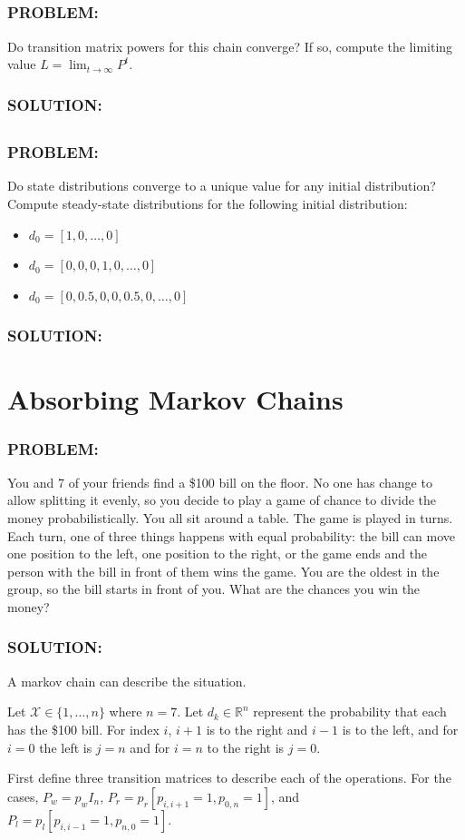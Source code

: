 \documentclass[]{article}
\newcommand{\Problem}{\subsubsection*{\textbf{PROBLEM:}}}
\newcommand{\Solution}{\subsubsection*{\textbf{SOLUTION:}}}
\newcommand{\R}{\mathbb{R}}
\begin{document}
\subsection{}
\Problem
Do transition matrix powers for this chain converge? If so, compute the limiting value $L = \lim_{t \to \infty} P^t$.
\Solution



\subsection{}
\Problem
Do state distributions converge to a unique value for any initial distribution? Compute steady-state distributions for the following initial distribution:
\begin{itemize}
    \item $d_0 = [1,0,\dots,0]$
    \item $d_0 = [0,0,0,1,0,\dots,0]$
    \item $d_0 = [0, 0.5, 0, 0, 0.5, 0, \dots,0]$
\end{itemize}

\Solution








\newpage
\section{Absorbing Markov Chains} 
\Problem
You and 7 of your friends find a \$100 bill on the floor. 
No one has change to allow splitting it evenly, so you decide to play a game of chance to divide the money probabilistically. 
You all sit around a table. 
The game is played in turns. 
Each turn, one of three things happens with equal probability: 
the bill can move one position to the left, one position to the right, or the game ends and the person with the bill in front of them wins the game. 
You are the oldest in the group, so the bill starts in front of you. 
What are the chances you win the money?

\Solution
A markov chain can describe the situation.

Let $\mathcal{X} \in \{1,\dots,n\}$ where $n=7$.
Let $d_{k} \in \R^n$ represent the probability that each has the \$100 bill.
For index $i$, $i+1$ is to the right and $i-1$ is to the left, and for $i=0$ the left is $j=n$ and for $i=n$ to the right is $j=0$.

First define three transition matrices to describe each of the operations.
For the cases, $P_w = p_w I_{n}$, $P_r = p_r [p_{i,i+1} = 1, p_{0,n}=1]$, and $P_l = p_l [p_{i,i-1} = 1, p_{n,0}=1]$.
\end{document}
